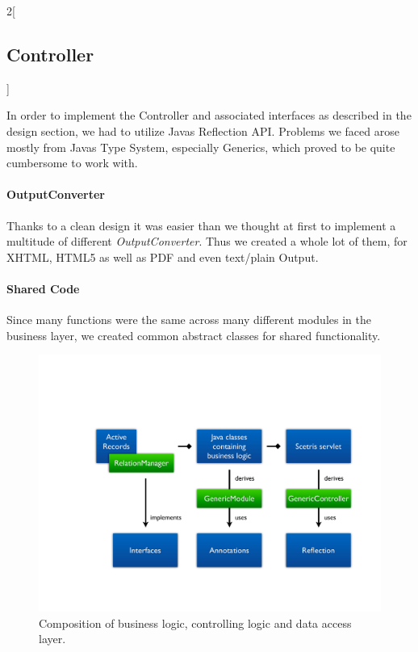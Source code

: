 \begin{multicols}{2}[\subsection{Controller}]

In order to implement the Controller and associated interfaces as described in the design section, we had to utilize Javas Reflection API. Problems we faced arose mostly from Javas Type System, especially Generics, which proved to be quite cumbersome to work with.

\paragraph{OutputConverter} Thanks to a clean design it was easier than we thought at first to implement a multitude of different \emph{OutputConverter}. Thus we created a whole lot of them, for XHTML, HTML5 as well as PDF and even text/plain Output.

\paragraph{Shared Code} Since many functions were the same across many different modules in the business layer, we created common abstract classes for shared functionality.


\begin{figure}[H]
	\centering
		\includegraphics[width=\columnwidth]{images/web-classes.pdf}
	\caption{Composition of business logic, controlling logic and data access layer.}
	\label{fig:scheduler}
\end{figure}


\end{multicols}
